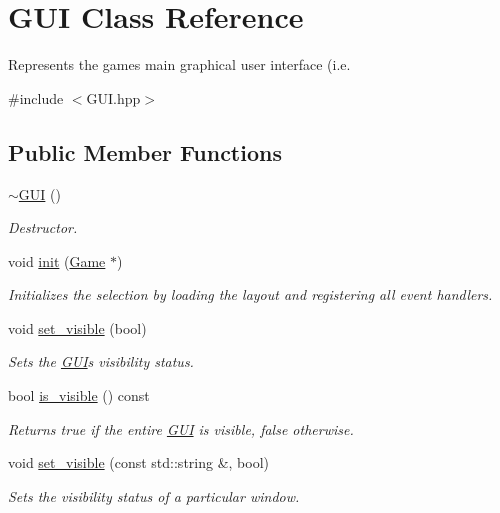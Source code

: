 \hypertarget{class_g_u_i}{}\section{G\+UI Class Reference}
\label{class_g_u_i}


Represents the game\textquotesingle{}s main graphical user interface (i.\+e.  




{\ttfamily \#include $<$G\+U\+I.\+hpp$>$}

\subsection*{Public Member Functions}
\begin{DoxyCompactItemize}
\item 
\hyperlink{class_g_u_i_ac9cae2328dcb5d83bdfaeca49a2eb695}{$\sim$\+G\+UI} ()
\begin{DoxyCompactList}\small\item\em Destructor. \end{DoxyCompactList}\item 
void \hyperlink{class_g_u_i_a91b0fc72a458e688947da1c86e859750}{init} (\hyperlink{class_game}{Game} $\ast$)
\begin{DoxyCompactList}\small\item\em Initializes the selection by loading the layout and registering all event handlers. \end{DoxyCompactList}\item 
void \hyperlink{class_g_u_i_a37c94218f5c1d9d9b955ee7796ba9247}{set\+\_\+visible} (bool)
\begin{DoxyCompactList}\small\item\em Set\textquotesingle{}s the \hyperlink{class_g_u_i}{G\+UI}\textquotesingle{}s visibility status. \end{DoxyCompactList}\item 
bool \hyperlink{class_g_u_i_af2fb755008d9734fef2c0d4f94ad5bab}{is\+\_\+visible} () const 
\begin{DoxyCompactList}\small\item\em Returns true if the entire \hyperlink{class_g_u_i}{G\+UI} is visible, false otherwise. \end{DoxyCompactList}\item 
void \hyperlink{class_g_u_i_a56664bc17967fdb694c5876a23229830}{set\+\_\+visible} (const std\+::string \&, bool)
\begin{DoxyCompactList}\small\item\em Set\textquotesingle{}s the visibility status of a particular window. \end{DoxyCompactList}\item 

\end{DoxyCompactItemize}

